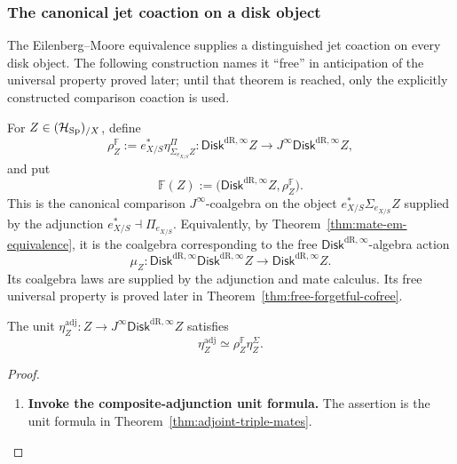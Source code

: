 \subsubsection{The canonical jet coaction on a disk object}

The Eilenberg--Moore equivalence supplies a distinguished jet coaction on every
disk object. The following construction names it ``free'' in anticipation of
the universal property proved later; until that theorem is reached, only the
explicitly constructed comparison coaction is used.

\begin{construction}
\label{con:free-disk-coalgebra}
For \(Z\in(\mathcal H_{\operatorname{Sp}})_{/X}\), define
\[
  \rho_Z^{\mathbb F}
  :=
  e_{X/S}^*\eta^\Pi_{\Sigma_{e_{X/S}} Z}:
  \mathsf{Disk}^{\mathrm{dR},\infty} Z\longrightarrow J^\infty \mathsf{Disk}^{\mathrm{dR},\infty} Z,
\]
and put
\[
  \mathbb F(Z)
  :=
  \bigl(\mathsf{Disk}^{\mathrm{dR},\infty} Z,\rho_Z^{\mathbb F}\bigr).
\]
This is the canonical comparison \(J^\infty\)-coalgebra on the object
\(e_{X/S}^*\Sigma_{e_{X/S}} Z\) supplied by the adjunction
\(e_{X/S}^*\dashv\Pi_{e_{X/S}}\). Equivalently, by
Theorem~\ref{thm:mate-em-equivalence}, it is the coalgebra corresponding to the
free \(\mathsf{Disk}^{\mathrm{dR},\infty}\)-algebra action
\[
  \mu_Z:\mathsf{Disk}^{\mathrm{dR},\infty} \mathsf{Disk}^{\mathrm{dR},\infty} Z\to \mathsf{Disk}^{\mathrm{dR},\infty} Z.
\]
Its coalgebra laws are supplied by the adjunction and mate calculus. Its free
universal property is proved later in
Theorem~\ref{thm:free-forgetful-cofree}.
\end{construction}

\begin{proposition}
\label{prop:disk-jet-unit-factorization}
The unit \(\eta^{\mathrm{adj}}_Z:Z\to J^\infty \mathsf{Disk}^{\mathrm{dR},\infty} Z\) satisfies
\[
  \eta^{\mathrm{adj}}_Z\simeq\rho_Z^{\mathbb F}\eta^\Sigma_Z.
\]
\end{proposition}

\begin{proof}
\leavevmode
\begin{enumerate}[label=\textup{(\arabic*)}]
    \item \textbf{Invoke the composite-adjunction unit formula.}
The assertion is the unit formula in Theorem~\ref{thm:adjoint-triple-mates}.
\end{enumerate}
\end{proof}

